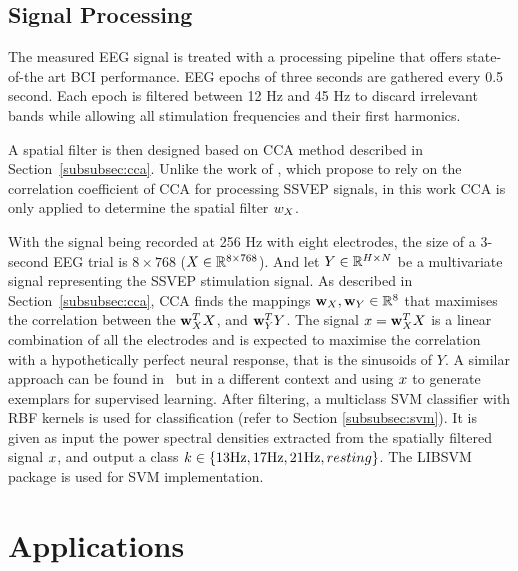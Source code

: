 \subsection{Signal Processing}

The measured EEG signal is treated with a processing pipeline that offers state-of-the art BCI performance.
EEG epochs of three seconds are gathered every 0.5 second. 
Each epoch is filtered between 12 Hz and 45 Hz to discard irrelevant bands while allowing all stimulation frequencies and their first harmonics. 

A spatial filter is then designed based on CCA method described in Section~\ref{subsubsec:cca}.
Unlike the work of \citep{lin_frequency_2006}, which propose to rely on the correlation coefficient of CCA for processing SSVEP signals, in this work CCA is only applied to determine the spatial filter $w_{X}$.


With the signal being recorded at 256 Hz with eight electrodes, the size of a 3-second EEG trial is $8 \times 768$ ($X \in \mathbb{R}^{8 \times 768}$). And let $Y \in \mathbb{R}^{H \times N}$ be a multivariate signal representing the SSVEP stimulation signal.
As described in Section~\ref{subsubsec:cca}, CCA finds the mappings $\mathbf{w}_{X}, \mathbf{w}_{Y} \in \mathbb{R}^{8}$ that maximises the correlation between the $\mathbf{w}_{X}^T X$, and $\mathbf{w}_{Y}^T Y$.
The signal $x = \mathbf{w}_{X}^T X$ is a linear combination of all the electrodes and is expected to maximise the correlation with a hypothetically perfect neural response, that is the sinusoids of $Y$.
A similar approach can be found in~\citep{spuler_one_2012} but in a different context and using $x$ to generate exemplars for supervised learning.
After filtering, a multiclass SVM classifier with RBF kernels is used for classification (refer to Section \ref{subsubsec:svm}). 
It is given as input the power spectral densities extracted from the spatially filtered signal $x$, and output a class $k \in \left\lbrace 13 \mathrm{Hz}, 17 \mathrm{Hz}, 21\mathrm{Hz}, resting \right\rbrace$.
The LIBSVM \citep{chang_libsvm:_2011} package is used for SVM implementation.

\section{Applications}

